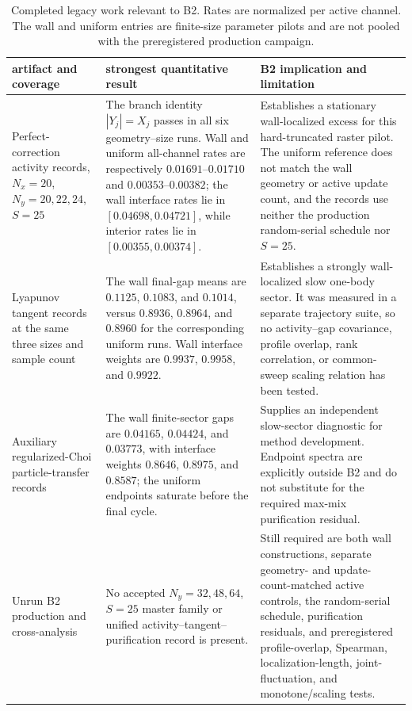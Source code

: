 \documentclass[aps,prx,twocolumn,floatfix,nofootinbib,superscriptaddress,longbibliography]{revtex4-2}
\newcommand{\campaignTableSetup}{%
  \footnotesize
  \setlength{\tabcolsep}{4pt}%
  \renewcommand{\arraystretch}{1.12}%
}
\begin{document}
\begin{table}[t]
\campaignTableSetup
\caption{Completed legacy work relevant to B2.  Rates are normalized per active channel.
The wall and uniform entries are finite-size parameter pilots and are not pooled with the
preregistered production campaign.}
\label{tab:B2-legacy}
\begin{tabularx}{\textwidth}{@{}L{0.75}L{1.10}L{1.15}@{}}
\toprule
artifact and coverage & strongest quantitative result & B2 implication and limitation \\
\midrule
Perfect-correction activity records, $N_x=20$, $N_y=20,22,24$, $S=25$
& The branch identity $|Y_j|=X_j$ passes in all six geometry--size runs.  Wall and
uniform all-channel rates are respectively $0.01691$--$0.01710$ and
$0.00353$--$0.00382$; the wall interface rates lie in $[0.04698,0.04721]$, while
interior rates lie in $[0.00355,0.00374]$.
& Establishes a stationary wall-localized excess for this hard-truncated raster pilot.
The uniform reference does not match the wall geometry or active update count, and the
records use neither the production random-serial schedule nor $S=25$. \\
Lyapunov tangent records at the same three sizes and sample count
& The wall final-gap means are $0.1125$, $0.1083$, and $0.1014$, versus $0.8936$,
$0.8964$, and $0.8960$ for the corresponding uniform runs.  Wall interface weights are
$0.9937$, $0.9958$, and $0.9922$.
& Establishes a strongly wall-localized slow one-body sector.  It was measured in a
separate trajectory suite, so no activity--gap covariance, profile overlap, rank
correlation, or common-sweep scaling relation has been tested. \\
Auxiliary regularized-Choi particle-transfer records
& The wall finite-sector gaps are $0.04165$, $0.04424$, and $0.03773$, with interface
weights $0.8646$, $0.8975$, and $0.8587$; the uniform endpoints saturate before the final
cycle.
& Supplies an independent slow-sector diagnostic for method development.  Endpoint
spectra are explicitly outside B2 and do not substitute for the required max-mix
purification residual. \\
Unrun B2 production and cross-analysis
& No accepted $N_y=32,48,64$, $S=25$ master family or unified activity--tangent--
purification record is present.
& Still required are both wall constructions, separate geometry- and
update-count-matched active controls, the random-serial schedule, purification residuals,
and preregistered profile-overlap, Spearman, localization-length, joint-fluctuation, and
monotone/scaling tests. \\
\bottomrule
\end{tabularx}
\end{table}
\end{document}
